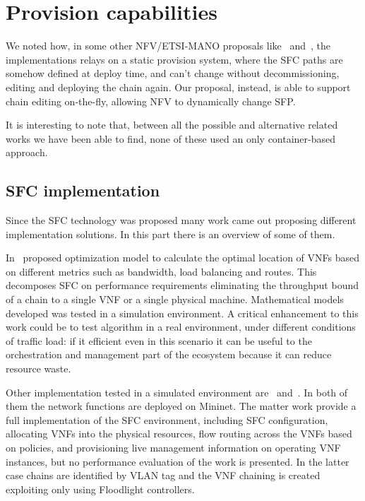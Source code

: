 \section{Provision capabilities}
We noted how, in some other NFV/ETSI-MANO proposals like~\cite{soares2015toward}
and~\cite{abujoda2015midas}, the implementations relays on a static provision
system, where the SFC paths are somehow defined at deploy time, and can't change
without decommissioning, editing and deploying the chain again. Our proposal,
instead, is able to support chain editing on-the-fly, allowing NFV to
dynamically change SFP.

\vspace{1cm}

\noindent It is interesting to note that, between all the possible and 
alternative related works we have been able to find, none of these used an only
container-based approach.

\subsection{SFC implementation}
Since the SFC technology was proposed many work came out proposing different
implementation solutions. In this part there is an overview of some of them.

In~\cite{GhaznaviSAB16} proposed optimization model to calculate the optimal
location of VNFs based on different metrics such as bandwidth, load balancing
and routes. This decomposes SFC on performance requirements eliminating the
throughput bound of a chain to a single VNF or a single physical machine.
Mathematical models developed was tested in a simulation environment. A critical
enhancement to this work could be to test algorithm in a real environment, under
different conditions of traffic load: if it efficient even in this scenario it
can be useful to the orchestration and management part of the ecosystem because
it can reduce resource waste. 

Other implementation tested in a simulated environment
are~\cite{csoma2014escape} and~\cite{kim2016evaluations}. In both of them the
network functions are deployed on Mininet. The matter work provide a full
implementation of the SFC environment, including SFC configuration, allocating
VNFs into the physical resources, flow routing across the VNFs based on
policies, and provisioning live management information on operating VNF
instances, but no performance evaluation of the work is presented. In the
latter case chains are identified by VLAN tag and the VNF chaining is created
exploiting only using Floodlight controllers. 

